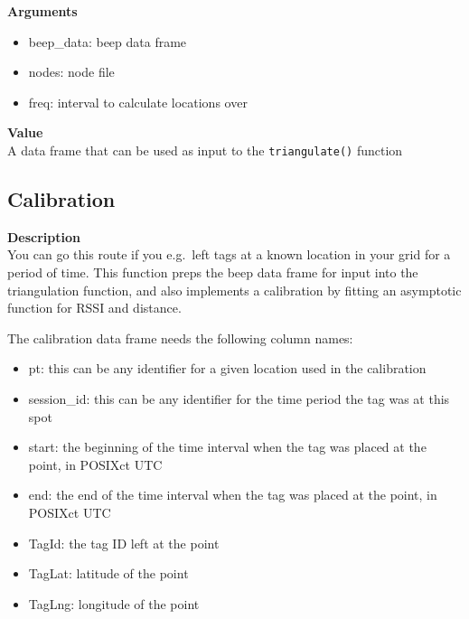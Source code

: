 \documentclass[
]{book}
\providecommand{\tightlist}{%
  \setlength{\itemsep}{0pt}\setlength{\parskip}{0pt}}
\begin{document}
\textbf{Arguments}

\begin{itemize}
\tightlist
\item
  beep\_data: beep data frame\\
\item
  nodes: node file\\
\item
  freq: interval to calculate locations over
\end{itemize}

\textbf{Value}\\
A data frame that can be used as input to the \texttt{triangulate()} function

\hypertarget{calibration}{%
\subsection{Calibration}\label{calibration}}

\textbf{Description}\\
You can go this route if you e.g.~left tags at a known location in your grid for a period of time. This function preps the beep data frame for input into the triangulation function, and also implements a calibration by fitting an asymptotic function for RSSI and distance.

The calibration data frame needs the following column names:

\begin{itemize}
\tightlist
\item
  pt: this can be any identifier for a given location used in the calibration\\
\item
  session\_id: this can be any identifier for the time period the tag was at this spot\\
\item
  start: the beginning of the time interval when the tag was placed at the point, in POSIXct UTC\\
\item
  end: the end of the time interval when the tag was placed at the point, in POSIXct UTC\\
\item
  TagId: the tag ID left at the point\\
\item
  TagLat: latitude of the point\\
\item
  TagLng: longitude of the point
\end{itemize}
\end{document}
